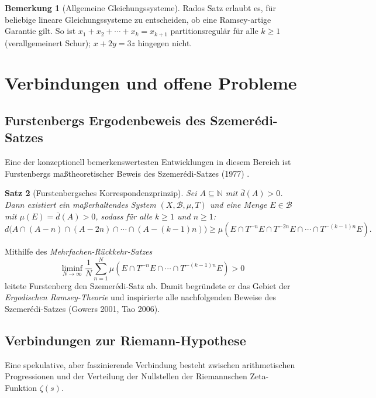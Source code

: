 \documentclass[12pt,a4paper]{amsart}
\newtheorem{theorem}{Satz}[section]
\theoremstyle{definition}
\newtheorem{remark}[theorem]{Bemerkung}
\newcommand{\N}{\mathbb{N}}
\begin{document}
\begin{remark}[Allgemeine Gleichungssysteme]
Rados Satz erlaubt es, für beliebige lineare Gleichungssysteme zu entscheiden, ob
eine Ramsey-artige Garantie gilt. So ist $x_1 + x_2 + \cdots + x_k = x_{k+1}$
partitionsregulär für alle $k \geq 1$ (verallgemeinert Schur); $x + 2y = 3z$
hingegen nicht.
\end{remark}

\section{Verbindungen und offene Probleme}\label{sec:verbindungen}

\subsection{Furstenbergs Ergodenbeweis des Szemerédi-Satzes}

Eine der konzeptionell bemerkenswertesten Entwicklungen in diesem Bereich ist
Furstenbergs maßtheoretischer Beweis des Szemerédi-Satzes (1977) \cite{Furstenberg1977}.

\begin{theorem}[Furstenbergsches Korrespondenzprinzip]
Sei $A \subseteq \N$ mit $\overline{d}(A) > 0$. Dann existiert ein maßerhaltendes
System $(X, \mathcal{B}, \mu, T)$ und eine Menge $E \in \mathcal{B}$ mit
$\mu(E) = \overline{d}(A) > 0$, sodass für alle $k \geq 1$ und $n \geq 1$:
\[
  d\bigl(A \cap (A-n) \cap (A-2n) \cap \cdots \cap (A-(k-1)n)\bigr) \geq
  \mu(E \cap T^{-n}E \cap T^{-2n}E \cap \cdots \cap T^{-(k-1)n}E).
\]
\end{theorem}

Mithilfe des \emph{Mehrfachen-Rückkehr-Satzes}
\[
  \liminf_{N\to\infty} \frac{1}{N}\sum_{n=1}^N \mu(E \cap T^{-n}E \cap \cdots \cap T^{-(k-1)n}E) > 0
\]
leitete Furstenberg den Szemerédi-Satz ab. Damit begründete er das Gebiet der
\emph{Ergodischen Ramsey-Theorie} und inspirierte alle nachfolgenden Beweise des
Szemerédi-Satzes (Gowers 2001, Tao 2006).

\subsection{Verbindungen zur Riemann-Hypothese}

Eine spekulative, aber faszinierende Verbindung besteht zwischen arithmetischen
Progressionen und der Verteilung der Nullstellen der Riemannschen Zeta-Funktion
$\zeta(s)$.
\end{document}
